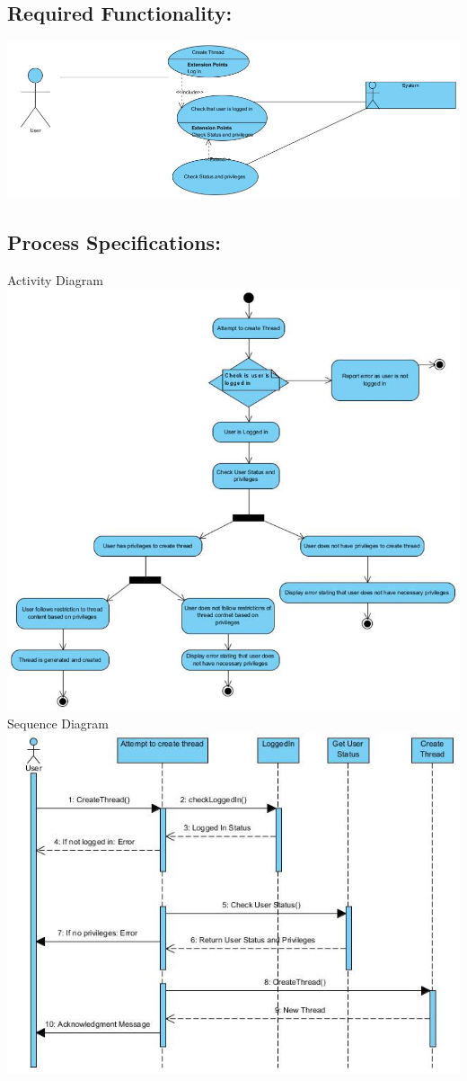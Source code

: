 \documentclass[a4paper,11pt]{article}
\begin{document}
\subsection{Required Functionality:} 
\includegraphics[width=\linewidth]{./Images/CRUDThread/Diagrams/2.jpg}
\subsection{Process Specifications:} 
Activity Diagram\\
\includegraphics[width=\linewidth]{./Images/CRUDThread/Diagrams/3.jpg}
\newpage
Sequence Diagram\\
\includegraphics[width=1\linewidth]{./Images/CRUDThread/Diagrams/4.jpg}\\
\end{document}

